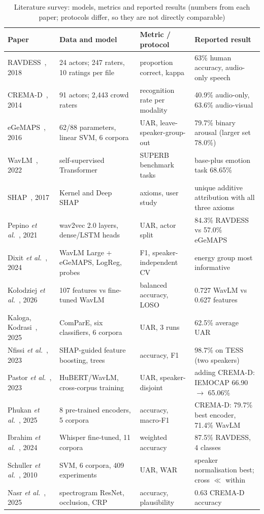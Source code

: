 \documentclass[conference]{IEEEtran}
\begin{document}
\begin{table}[!t]
\centering
\caption{Literature survey: models, metrics and reported results (numbers from each paper; protocols differ, so they are not directly comparable)}
\label{tab:lit}
\footnotesize
\begin{tabular}{@{}p{3.1cm}p{4.7cm}p{3.6cm}p{5.2cm}@{}}
\toprule
\textbf{Paper} & \textbf{Data and model} & \textbf{Metric / protocol} & \textbf{Reported result} \\
\midrule
RAVDESS~\cite{ravdess}, 2018 & 24 actors; 247 raters, 10 ratings per file & proportion correct, kappa & 63\% human accuracy, audio-only speech \\
CREMA-D~\cite{cremad}, 2014 & 91 actors; 2{,}443 crowd raters & recognition rate per modality & 40.9\% audio-only, 63.6\% audio-visual \\
eGeMAPS~\cite{egemaps}, 2016 & 62/88 parameters, linear SVM, 6 corpora & UAR, leave-speaker-group-out & 79.7\% binary arousal (larger set 78.0\%) \\
WavLM~\cite{wavlm}, 2022 & self-supervised Transformer & SUPERB benchmark tasks & base-plus emotion task 68.65\% \\
SHAP~\cite{shap}, 2017 & Kernel and Deep SHAP & axioms, user study & unique additive attribution with all three axioms \\
Pepino \emph{et al.}~\cite{pepino}, 2021 & wav2vec 2.0 layers, dense/LSTM heads & UAR, actor split & 84.3\% RAVDESS vs 57.0\% eGeMAPS \\
Dixit \emph{et al.}~\cite{dixit}, 2024 & WavLM Large + eGeMAPS, LogReg, probes & F1, speaker-independent CV & energy group most informative \\
Ko{\l}odziej \emph{et al.}~\cite{kolodziej}, 2026 & 107 features vs fine-tuned WavLM & balanced accuracy, LOSO & 0.727 WavLM vs 0.627 features \\
Kaloga, Kodrasi~\cite{kaloga}, 2025 & ComParE, six classifiers, 6 corpora & UAR, 3 runs & 62.5\% average UAR \\
Nfissi \emph{et al.}~\cite{nfissi}, 2023 & SHAP-guided feature boosting, trees & accuracy, F1 & 98.7\% on TESS (two speakers) \\
Pastor \emph{et al.}~\cite{pastor}, 2023 & HuBERT/WavLM, cross-corpus training & UAR, speaker-disjoint & adding CREMA-D: IEMOCAP 66.90 $\to$ 65.06\% \\
Phukan \emph{et al.}~\cite{phukan}, 2025 & 8 pre-trained encoders, 5 corpora & accuracy, macro-F1 & CREMA-D: 79.7\% best encoder, 71.4\% WavLM \\
Ibrahim \emph{et al.}~\cite{ibrahim}, 2024 & Whisper fine-tuned, 11 corpora & weighted accuracy & 87.5\% RAVDESS, 4 classes \\
Schuller \emph{et al.}~\cite{schuller}, 2010 & SVM, 6 corpora, 409 experiments & UAR, WAR & speaker normalisation best; cross $\ll$ within \\
Nasr \emph{et al.}~\cite{nasr}, 2025 & spectrogram ResNet, occlusion, CRP & accuracy, plausibility & 0.63 CREMA-D accuracy \\
\bottomrule
\end{tabular}
\end{table}
\end{document}
